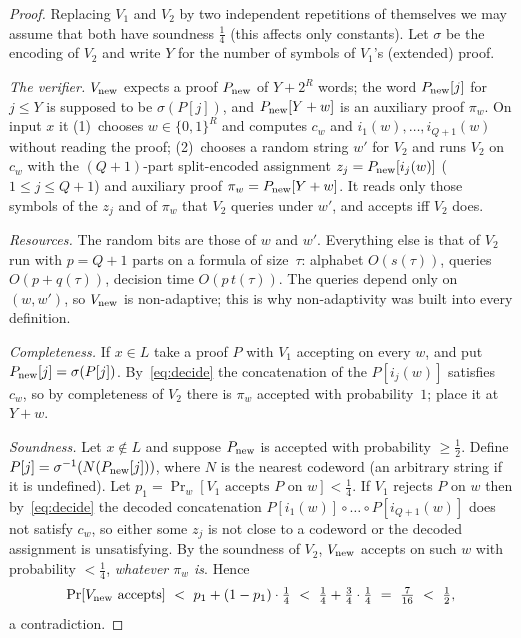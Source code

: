 \begin{proof}
Replacing $V_1$ and $V_2$ by two independent repetitions of themselves we may assume that both have soundness $\tfrac14$ (this affects only constants).
Let $\sigma$ be the encoding of $V_2$ and write $Y$ for the number of symbols of $V_1$'s (extended) proof.

\emph{The verifier.}  $V_{\rm new}$ expects a proof $P_{\rm new}$ of $Y+2^R$ words; the word $P_{\rm new}[j]$ for $j\le Y$ is supposed to be $\sigma(P[j])$, and $P_{\rm new}[Y+w]$ is an auxiliary proof $\pi_w$.
On input $x$ it (1)~chooses $w\in\{0,1\}^R$ and computes $c_w$ and $i_1(w),\dots,i_{Q+1}(w)$ without reading the proof; (2)~chooses a random string $w'$ for $V_2$ and runs $V_2$ on $c_w$ with the
$(Q{+}1)$-part split-encoded assignment $z_j=P_{\rm new}[i_j(w)]$ ($1\le j\le Q+1$) and auxiliary proof $\pi_w=P_{\rm new}[Y+w]$.  It reads only those symbols of the $z_j$ and of $\pi_w$ that $V_2$ queries under $w'$, and accepts iff $V_2$ does.

\emph{Resources.}  The random bits are those of $w$ and $w'$.  Everything else is that of $V_2$ run with $p=Q+1$ parts on a formula of size~$\tau$: alphabet $O(s(\tau))$, queries $O(p+q(\tau))$, decision time $O(p\,t(\tau))$.
The queries depend only on $(w,w')$, so $V_{\rm new}$ is non-adaptive; this is why non-adaptivity was built into every definition.

\emph{Completeness.}  If $x\in L$ take a proof $P$ with $V_1$ accepting on every $w$, and put $P_{\rm new}[j]=\sigma(P[j])$.  By~\eqref{eq:decide} the concatenation of the $P[i_j(w)]$ satisfies $c_w$, so by completeness of $V_2$ there is $\pi_w$ accepted with
probability~$1$; place it at $Y+w$.

\emph{Soundness.}  Let $x\notin L$ and suppose $P_{\rm new}$ is accepted with probability $\ge\tfrac12$.  Define $P[j]=\sigma^{-1}(N(P_{\rm new}[j]))$, where $N$ is the nearest codeword (an arbitrary string if it is undefined).
Let $p_1=\Pr_w[V_1\text{ accepts }P\text{ on }w]<\tfrac14$.  If $V_1$ rejects $P$ on $w$ then by~\eqref{eq:decide} the decoded concatenation $P[i_1(w)]\circ\dots\circ P[i_{Q+1}(w)]$ does not satisfy $c_w$, so
either some $z_j$ is not close to a codeword or the decoded assignment is unsatisfying.  By the soundness of $V_2$, $V_{\rm new}$ accepts on such $w$ with probability $<\tfrac14$, \emph{whatever $\pi_w$ is}.  Hence
\[
  \Pr[V_{\rm new}\text{ accepts}]\ <\ p_1+(1-p_1)\cdot\tfrac14\ <\ \tfrac14+\tfrac34\cdot\tfrac14\ =\ \tfrac7{16}\ <\ \tfrac12,
\]
a contradiction.
\end{proof}

